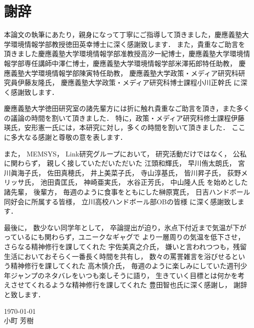 \chapter*{謝辞}
本論文の執筆にあたり，親身になって丁寧にご指導して頂きました，慶應義塾大学環境情報学部教授徳田英幸博士に深く感謝致します．
また，貴重なご助言を頂きました慶應義塾大学環境情報学部准教授高汐一紀博士，慶應義塾大学環境情報学部専任講師中澤仁博士，慶應義塾大学環境情報学部米澤拓郎特任助教，
慶應義塾大学環境情報学部陳寅特任助教，
慶應義塾大学政策・メディア研究科研究員伊藤友隆氏，
慶應義塾大学政策・メディア研究科博士課程小川正幹氏
に深く感謝致します．

慶應義塾大学徳田研究室の諸先輩方には折に触れ貴重なご助言を頂き，また多くの議論の時間を割いて頂きました．
特に，政策・メディア研究科修士課程伊藤瑛氏，安形憲一氏には，本研究に対し，多くの時間を割いて頂きました．
ここに多大なる感謝と尊敬の意を表します．

また，
MEMSYS，
Link研究グループにおいて，
研究活動だけではなく，
公私に関わらず，
親しく接していただいただいた
江頭和輝氏，
早川侑太朗氏，
宮川眞海子氏，
佐田真穂氏，
井上美菜子氏，
寺山淳基氏，
皆川昇子氏，
荻野メリッサ氏，
池田貴匡氏，
神崎亜実氏，
水谷正芳氏，
中山隆人氏
を始めとした諸先輩，
後輩方，
毎週のように食事をともにした榊原寛氏，
日吉ハンドボール同好会に所属する皆様，
立川高校ハンドボール部OBの皆様
に深く感謝致します．

最後に，
数少ない同学年として，
卒論提出が迫り，氷点下付近まで気温が下がっているにも関わらず，ユニークなギャグで
より一層周りの気温を低下させ，さらなる精神修行を課してくれた
宇佐美真之介氏，
嫌いと言われつつも，残留生活においておそらく一番長く時間を共有し，
数々の罵詈雑言を浴びせるという精神修行を課してくれた
高木慎介氏，
毎週のように楽しみにしていた週刊少年ジャンプのネタバレをいつも楽しそうに語り，
生きていく目標とは何かを考えさせてくれるような精神修行を課してくれた
豊田智也氏に深く感謝し，
謝辞と致します．




\begin{flushright}
\today\\
小町 芳樹
\end{flushright}
